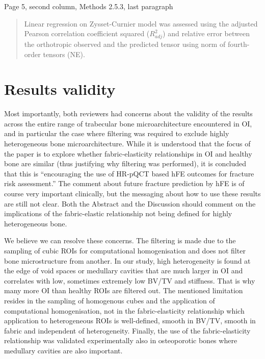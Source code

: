 \documentclass{AR2RC}
\begin{document}
Page 5, second column, Methods 2.5.3, last paragraph
\begin{quote}
	Linear regression on Zysset-Curnier model was assessed using the adjusted Pearson correlation coefficient squared ($R^2_{adj}$) and relative error between the orthotropic observed and the predicted tensor using norm of fourth-order tensors (NE). 
\end{quote}

\section{Results validity}
\RC Most importantly, both reviewers had concerns about the validity of the results across the entire range of trabecular bone microarchitecture encountered in OI, and in particular the case where filtering was required to exclude highly heterogeneous bone microarchitecture. While it is understood that the focus of the paper is to explore whether fabric-elasticity relationships in OI and healthy bone are similar (thus justifying why filtering was performed), it is concluded that this is “encouraging the use of HR-pQCT based hFE outcomes for fracture risk assessment.” The comment about future fracture prediction by hFE is of course very important clinically, but the messaging about how to use these results are still not clear. Both the Abstract and the Discussion should comment on the implications of the fabric-elastic relationship not being defined for highly heterogeneous bone. 

\AR We believe we can resolve these concerns. The filtering is made due to the sampling of cubic ROIs for computational homogenisation and does not filter bone microstructure from another. In our study, high heterogeneity is found at the edge of void spaces or medullary cavities that are much larger in OI and correlates with low, sometimes extremely low BV/TV and stiffness. That is why many more OI than healthy ROIs are filtered out.
The mentioned limitation resides in the sampling of homogenous cubes and the application of computational homogenisation, not in the fabric-elasticity relationship which application to heterogeneous ROIs is well-defined, smooth in BV/TV, smooth in fabric and independent of heterogeneity. Finally, the use of the fabric-elasticity relationship was validated experimentally also in osteoporotic bones where medullary cavities are also important.
\end{document}
